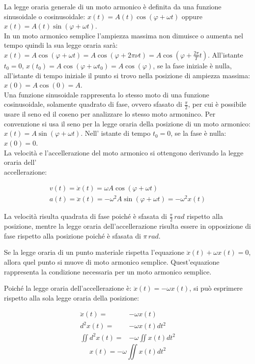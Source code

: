 \documentclass{article}
\numberwithin{equation}{subsection}
\begin{document}
La legge oraria generale di un moto armonico è definita da 
una funzione sinusoidale o cosinusoidale: $x(t) = A(t)\cos(\varphi+\omega t)$ oppure $ x(t) = A(t)\sin(\varphi+\omega t)$.\\ 
In un moto armonico semplice l'ampiezza massima non dimuisce o 
aumenta nel tempo quindi la sua legge oraria sarà:  
$x(t) = A\cos(\varphi + \omega t) =A\cos(\varphi + 2\pi\nu t) = A\cos\left(\varphi + \displaystyle\frac{2\pi}{T}t\right)$.
All'istante $t_0 = 0$, $x(t_0) = A\cos(\varphi + \omega t_0) = 
A\cos(\varphi)$, se la fase iniziale è nulla, all'istante di 
tempo iniziale il punto si trovo nella posizione 
di ampiezza massima: $x(0) = A\cos(0) = A$. 
\\
Una funzione sinusoidale rappresenta lo stesso moto di una funzione cosinusoidale, solamente quadrato di fase, ovvero sfasato di $\displaystyle\frac{\pi}{2}$, 
per cui è possibile usare il seno ed il coseno per analizzare lo stesso moto armoninco. 
Per convenzione si usa il seno per la legge oraria della posizione 
di un moto armonico: $x(t) = A\sin(\varphi + \omega t)$. Nell' 
istante di tempo $t_0 = 0$, se la fase è nulla: $x(0) = 0$. 
\\
La velocità e l'accellerazione del moto armonico si ottengono 
derivando la legge oraria dell'\\accellerazione:

\begin{gather}
    v(t) = \dot x(t) = \omega A\cos(\varphi+\omega t)\\
    a(t)= \ddot x(t) = -\omega^{2}A\sin(\varphi+\omega t) = -\omega^{2}x(t)
\end{gather}

La velocità risulta quadrata di fase poiché è sfasata di $\displaystyle\frac{\pi}{2}\,rad$  rispetto alla posizione, mentre la legge oraria dell'accellerazione 
risulta essere in opposizione di fase rispetto alla posizione poiché è sfasata di $\pi\,rad$. 

Se la legge oraria di un punto materiale rispetta l'equazione $\ddot x(t)+\omega x(t)=0$, allora quel punto si muove di moto armonico semplice. Quest'equazione 
rappresenta la condizione necessaria per un moto armonico semplice. 

Poiché la legge oraria dell'accellerazione è: $\ddot x(t) = -\omega x(t)$, 
si può esprimere rispetto alla sola legge oraria della posizione:

\begin{align*}
    \ddot x(t) =& -\omega x(t) \\
    d^{2}x(t) =& -\omega x(t)dt^{2} \\
    \displaystyle\iint d^{2}x(t)=& -\omega\iint x(t)dt^{2} 
\end{align*}
\begin{equation}
    \displaystyle x(t) = -\omega\iint x(t)dt^{2}
\end{equation}
\end{document}
